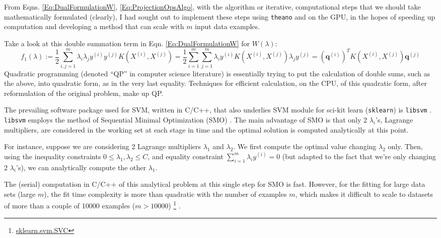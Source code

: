 \documentclass[10pt]{amsart}
\begin{document}
\begin{multicols*}{2}
From Eqns. \ref{Eq:DualFormulationW}, \ref{Eq:ProjectionOpsAlgo}, with the algorithm or iterative, computational steps that we should take mathematically formulated (clearly), I had sought out to implement these steps using \verb|theano| and on the GPU, in the hopes of speeding up computation and developing a method that can scale with $m$ input data examples.  

Take a look at this double summation term in Eqn. \ref{Eq:DualFormulationW} for $W(\lambda)$:
\begin{equation}\label{Eq:doublesumf_1}
f_1(\lambda) := \frac{1}{2} \sum_{i,j=1}^m \lambda_i \lambda_j y^{(i)} y^{(j)} K(X^{(i)},X^{(j)}) = \frac{1}{2} \sum_{i=1}^m\sum_{j=1}^m \lambda_i y^{(i)} K(X^{(i)},X^{(j)}) \lambda_j y^{(j)} = (\mathbf{q}^{(i)})^T K(X^{(i)},X^{(j)}) \mathbf{q}^{(j)}
\end{equation}
Quadratic programming (denoted ``QP'' in computer science literature) is essentially trying to put the calculation of double sums, such as the above, into quadratic form, as in the very last equality.  Techniques for efficient calculation, on the CPU, of this quadratic form, after reformulation of the original problem, make up QP.

The prevailing software package used for SVM, written in C/C++, that also underlies SVM module for sci-kit learn (\verb|sklearn|) \cite{Pedr2011} is \verb|libsvm| \cite{ChLi2011}.  \verb|libsvm| employs the method of Sequential Minimal Optimization (SMO) \cite{Pla1998}.  The main advantage of SMO is that only 2 $\lambda_i$'s, Lagrange multipliers, are considered in the working set at each stage in time and the optimal solution is computed analytically at this point.

For instance, suppose we are considering 2 Lagrange multipliers $\lambda_1$ and $\lambda_2$.  We first compute the optimal value changing $\lambda_2$ only.  Then, using the inequality constraints $0 \leq \lambda_1,\lambda_2\leq C$, and equality constraint $\sum_{i=1}^m \lambda_iy^{(i)} =0$ (but adapted to the fact that we're only changing 2 $\lambda_i$'s), we can analytically compute the other $\lambda_1$.

The (serial) computation in C/C++ of this analytical problem at this single step for SMO is fast.  However, for the fitting for large data sets (large $m$), the fit time complexity is more than quadratic with the number of examples $m$, which makes it difficult to scale to datasets of more than a couple of 10000 examples ($m>10000$) \footnote{\href{http://scikit-learn.org/stable/modules/generated/sklearn.svm.SVC.html\#sklearn.svm.SVC}{sklearn.svm.SVC}} \cite{Pedr2011}.  


\end{multicols*}
\end{document}
